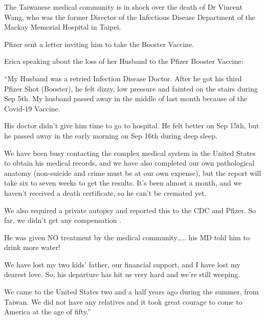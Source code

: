 The Taiwanese medical community is in shock over the death of Dr Vincent Wang,
who was the former Director of the Infectious Disease Department of the Mackay
Memorial Hospital in Taipei.

Pfizer sent a letter inviting him to take the Booster Vaccine.

Erica speaking about the loss of her Husband to the Pfizer Booster Vaccine:

“My Husband was a retried Infection Disease Doctor. After he got his third
Pfizer Shot (Booster), he felt dizzy, low pressure and fainted on the stairs
during Sep 5th. My husband passed away in the middle of last month because of
the Covid-19 Vaccine.

His doctor didn’t give him time to go to hospital. He felt better on Sep 15th,
but he passed away in the early morning on Sep 16th during deep sleep.

We have been busy contacting the complex medical system in the United States to
obtain his medical records, and we have also completed our own pathological
anatomy (non-suicide and crime must be at our own expense), but the report will
take six to seven weeks to get the results. It’s been almost a month, and we
haven’t received a death certificate, so he can’t be cremated yet.

We also required a private autopsy and reported this to the CDC and Pfizer. So
far, we didn’t get any compensation .

He was given NO treatment by the medical community….. his MD told him to drink
more water!

We have lost my two kids’ father, our financial support, and I have lost my
dearest love. So, his departure has hit us very hard and we’re still weeping.

We came to the United States two and a half years ago during the summer, from
Taiwan. We did not have any relatives and it took great courage to come to
America at the age of fifty.”

